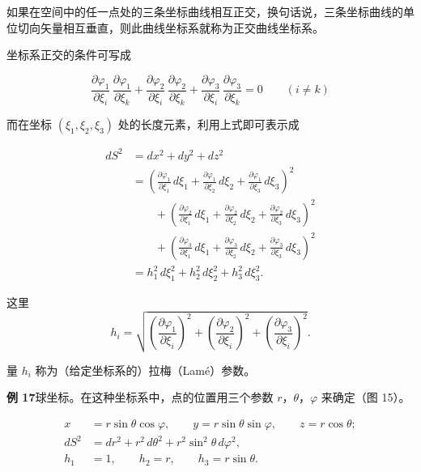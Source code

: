 如果在空间中的任一点处的三条坐标曲线相互正交，换句话说，三条坐标曲线的单位切向矢量相互垂直，则此曲线坐标系就称为正交曲线坐标系。

坐标系正交的条件可写成

\begin{equation}
\frac{\partial\varphi_1}{\partial\xi_i}\, \frac{\partial\varphi_1}{\partial\xi_k}
+ \frac{\partial\varphi_2}{\partial\xi_i}\, \frac{\partial\varphi_2}{\partial\xi_k}
+ \frac{\partial\varphi_3}{\partial\xi_i}\, \frac{\partial\varphi_3}{\partial\xi_k} = 0 \qquad (i \neq k)
\tag{1.62}
\end{equation}

而在坐标 $(\xi_1, \xi_2, \xi_3)$ 处的长度元素，利用上式即可表示成

\begin{equation*}
\begin{aligned}
dS^{2} &= dx^{2} + dy^{2} + dz^{2}\\
&= \left(\frac{\partial\varphi_1}{\partial\xi_1}\, d\xi_1 + \frac{\partial\varphi_1}{\partial\xi_2}\, d\xi_2 + \frac{\partial\varphi_1}{\partial\xi_3}\, d\xi_3\right)^{2}\\
&\qquad + \left(\frac{\partial\varphi_2}{\partial\xi_1}\, d\xi_1 + \frac{\partial\varphi_2}{\partial\xi_2}\, d\xi_2 + \frac{\partial\varphi_2}{\partial\xi_3}\, d\xi_3\right)^{2}\\
&\qquad + \left(\frac{\partial\varphi_3}{\partial\xi_1}\, d\xi_1 + \frac{\partial\varphi_3}{\partial\xi_2}\, d\xi_2 + \frac{\partial\varphi_3}{\partial\xi_3}\, d\xi_3\right)^{2}\\
&= h_1^{2}\, d\xi_1^{2} + h_2^{2}\, d\xi_2^{2} + h_3^{2}\, d\xi_3^{2}.
\end{aligned}
\end{equation*}

这里
\begin{equation*}
h_i = \sqrt{\left(\frac{\partial\varphi_1}{\partial\xi_i}\right)^{2} + \left(\frac{\partial\varphi_2}{\partial\xi_i}\right)^{2} + \left(\frac{\partial\varphi_3}{\partial\xi_i}\right)^{2}}.
\end{equation*}

量 $h_i$ 称为（给定坐标系的）拉梅（Lam\'e）参数。

\textbf{例 17}\quad 球坐标。在这种坐标系中，点的位置用三个参数 $r$，$\theta$，$\varphi$ 来确定（图 15）。

\begin{equation*}
\begin{aligned}
x &= r \sin\theta \cos\varphi, \qquad y = r \sin\theta \sin\varphi, \qquad z = r \cos\theta;\\
dS^{2} &= dr^{2} + r^{2}\, d\theta^{2} + r^{2} \sin^{2}\theta\, d\varphi^{2},\\
h_1 &= 1, \qquad h_2 = r, \qquad h_3 = r \sin\theta.
\end{aligned}
\end{equation*}

